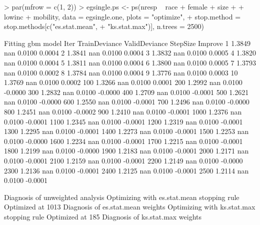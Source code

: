 \documentclass{article}
\begin{document}
\begin{Schunk}
\begin{Sinput}
> par(mfrow = c(1, 2))
> egsingle.ps <- ps(nresp ~ race + female + size + 
+     lowinc + mobility, data = egsingle.one, plots = "optimize", 
+     stop.method = stop.methods[c("es.stat.mean", 
+         "ks.stat.max")], n.trees = 2500)
\end{Sinput}
\begin{Soutput}
Fitting gbm model
Iter   TrainDeviance   ValidDeviance   StepSize   Improve
     1        1.3849             nan     0.0100    0.0004
     2        1.3841             nan     0.0100    0.0004
     3        1.3832             nan     0.0100    0.0005
     4        1.3820             nan     0.0100    0.0004
     5        1.3811             nan     0.0100    0.0004
     6        1.3800             nan     0.0100    0.0005
     7        1.3793             nan     0.0100    0.0002
     8        1.3784             nan     0.0100    0.0004
     9        1.3776             nan     0.0100    0.0003
    10        1.3769             nan     0.0100    0.0002
   100        1.3266             nan     0.0100    0.0001
   200        1.2992             nan     0.0100   -0.0000
   300        1.2832             nan     0.0100   -0.0000
   400        1.2709             nan     0.0100   -0.0001
   500        1.2621             nan     0.0100   -0.0000
   600        1.2550             nan     0.0100   -0.0001
   700        1.2496             nan     0.0100   -0.0000
   800        1.2451             nan     0.0100   -0.0002
   900        1.2410             nan     0.0100   -0.0001
  1000        1.2376             nan     0.0100   -0.0001
  1100        1.2345             nan     0.0100   -0.0001
  1200        1.2319             nan     0.0100   -0.0001
  1300        1.2295             nan     0.0100   -0.0001
  1400        1.2273             nan     0.0100   -0.0001
  1500        1.2253             nan     0.0100   -0.0000
  1600        1.2234             nan     0.0100   -0.0001
  1700        1.2215             nan     0.0100   -0.0001
  1800        1.2199             nan     0.0100   -0.0000
  1900        1.2183             nan     0.0100   -0.0001
  2000        1.2171             nan     0.0100   -0.0001
  2100        1.2159             nan     0.0100   -0.0001
  2200        1.2149             nan     0.0100   -0.0000
  2300        1.2136             nan     0.0100   -0.0001
  2400        1.2125             nan     0.0100   -0.0001
  2500        1.2114             nan     0.0100   -0.0001

Diagnosis of unweighted analysis
Optimizing with es.stat.mean stopping rule
   Optimized at 1013 
Diagnosis of es.stat.mean weights
Optimizing with ks.stat.max stopping rule
   Optimized at 185 
Diagnosis of ks.stat.max weights
\end{Soutput}
\end{Schunk}
\end{document}
